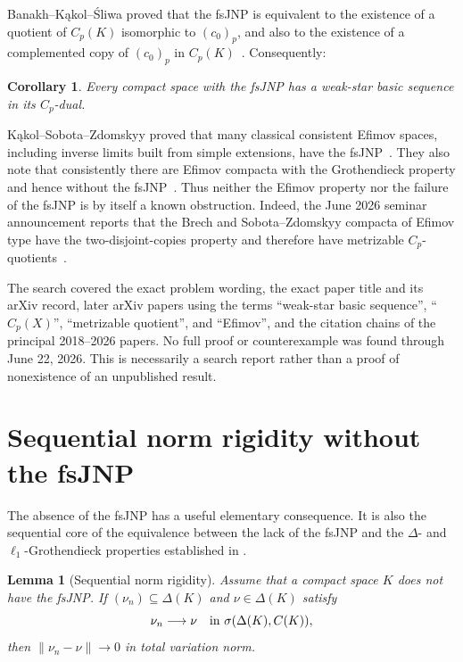 \documentclass[11pt]{article}
\newtheorem{lemma}[theorem]{Lemma}
\newtheorem{corollary}[theorem]{Corollary}
\newcommand{\Cp}{C_p}
\newcommand{\czerop}{(c_0)_p}
\begin{document}
Banakh--K\k{a}kol--\'Sliwa proved that the fsJNP is equivalent to the
existence of a quotient of $\Cp(K)$ isomorphic to $\czerop$, and also to the
existence of a complemented copy of $\czerop$ in
$\Cp(K)$~\cite[Theorem~1]{BKS2019JNP}.  Consequently:

\begin{corollary}\label{cor:fsjnp}
Every compact space with the fsJNP has a weak-star basic sequence in its
$\Cp$-dual.
\end{corollary}

K\k{a}kol--Sobota--Zdomskyy proved that many classical consistent Efimov
spaces, including inverse limits built from simple extensions, have the
fsJNP~\cite[Corollary~6.12]{KSZ2023}.  They also note that consistently there
are Efimov compacta with the Grothendieck property and hence without the
fsJNP~\cite[p.~16]{KSZ2023}.  Thus neither the Efimov property nor the failure
of the fsJNP is by itself a known obstruction.  Indeed, the June 2026 seminar
announcement reports that the Brech and Sobota--Zdomskyy compacta of Efimov
type have the two-disjoint-copies property and therefore have metrizable
$\Cp$-quotients~\cite{KakolSeminar2026}.

The search covered the exact problem wording, the exact paper title and its
arXiv record, later arXiv papers using the terms ``weak-star basic sequence'',
``$\Cp(X)$'', ``metrizable quotient'', and ``Efimov'', and the citation chains
of the principal 2018--2026 papers.  No full proof or counterexample was found
through June 22, 2026.  This is necessarily a search report rather than a proof
of nonexistence of an unpublished result.

\section{Sequential norm rigidity without the fsJNP}
\label{sec:norm-rigidity}

The absence of the fsJNP has a useful elementary consequence.  It is also the
sequential core of the equivalence between the lack of the fsJNP and the
$\Delta$- and $\ell_1$-Grothendieck properties established in
\cite[Theorem~4.1]{KSZ2023}.

\begin{lemma}[Sequential norm rigidity]\label{lem:norm-rigidity}
Assume that a compact space $K$ does not have the fsJNP.  If
$(\nu_n)\subseteq\Delta(K)$ and $\nu\in\Delta(K)$ satisfy
\[
 \nu_n\longrightarrow\nu
 \quad\hbox{in }\sigma(\Delta(K),C(K)),
\]
then $\|\nu_n-\nu\|\to0$ in total variation norm.
\end{lemma}
\end{document}
